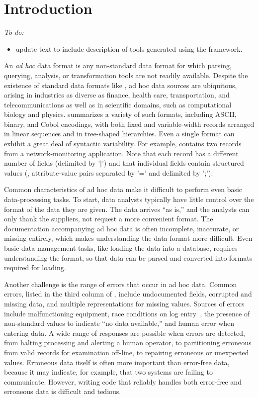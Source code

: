 \section{Introduction}
\label{sec:intro}

{\em
To do:
\begin{itemize}
\item update text to include description of tools generated using the framework.
\end{itemize}
}

An {\em ad hoc} data format is any non-standard data format for which
parsing, querying, analysis, or transformation tools are not readily
available.  Despite the existence of standard
data formats like \xml{}, ad hoc data sources are ubiquitous,
arising in industries as diverse as finance, health care,
transportation, and telecommunications as well as in scientific
domains, such as computational biology and physics.
 summarizes a variety of such formats,
including ASCII, binary, and Cobol encodings, with both fixed and
variable-width records arranged in linear sequences and in tree-shaped
hierarchies.  Even a single format can exhibit a great deal of
syntactic variability.  For example, 
contains two records from a network-monitoring application.  Note that
each record has a different number of fields (delimited by '$|$') and
that individual fields contain structured values (\eg{},
attribute-value pairs separated by '=' and delimited by ';').

Common characteristics of ad hoc data make it difficult to perform
even basic data-processing tasks.  To start, data analysts typically
have little control over the format of the data they are given.  The
data arrives ``as is,'' and the analysts can only thank the suppliers,
not request a more convenient format.  The documentation accompanying
ad hoc data is often incomplete, inaccurate, or missing entirely,
which makes understanding the data format more difficult.  Even basic
data-management tasks, like loading the data into a database, requires
understanding the format, so that data can be parsed and converted into
formats required for loading.

Another challenge is the range of errors that occur in ad hoc data.
Common errors, listed in the third column of
, include undocumented fields, corrupted
and missing data, and multiple representations for missing values.
Sources of errors include malfunctioning equipment, race conditions on
log entry~\cite{wpp}, the presence of non-standard values to indicate
``no data available,'' and human error when entering data.  A wide
range of responses are possible when errors are detected, from halting
processing and alerting a human operator, to partitioning erroneous
from valid records for examination off-line, to repairing erroneous or
unexpected values.  Erroneous data itself is often more important than
error-free data, because it may indicate, for example, that two
systems are failing to communicate.  However, writing code that
reliably handles both error-free and erroneous data is difficult and
tedious.


